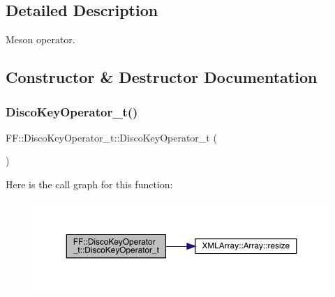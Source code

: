 \subsection{Detailed Description}
Meson operator. 

\subsection{Constructor \& Destructor Documentation}
\mbox{\label{structFF_1_1DiscoKeyOperator__t_ab4dabc722e586bb004065179dc9b4369}} 
\subsubsection{\texorpdfstring{DiscoKeyOperator\_t()}{DiscoKeyOperator\_t()}\hspace{0.1cm}{\footnotesize\ttfamily [1/2]}}
{\footnotesize\ttfamily F\+F\+::\+Disco\+Key\+Operator\+\_\+t\+::\+Disco\+Key\+Operator\+\_\+t (\begin{DoxyParamCaption}{ }\end{DoxyParamCaption})\hspace{0.3cm}{\ttfamily [inline]}}

Here is the call graph for this function\+:\nopagebreak
\begin{figure}[H]
\begin{center}
\leavevmode
\includegraphics[width=350pt]{dc/d42/structFF_1_1DiscoKeyOperator__t_ab4dabc722e586bb004065179dc9b4369_cgraph}
\end{center}
\end{figure}
\mbox{\label{structFF_1_1DiscoKeyOperator__t_ab4dabc722e586bb004065179dc9b4369}} 

